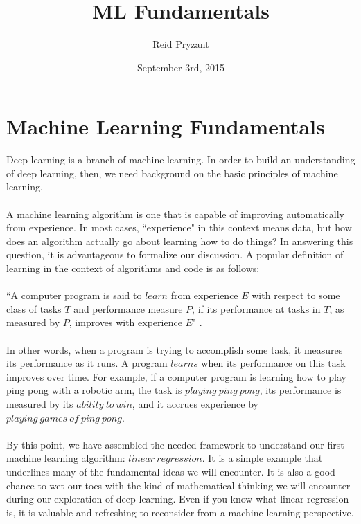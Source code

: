 \documentclass[a4paper]{article}
\title{ML Fundamentals}
\author{Reid Pryzant}
\date{September 3rd, 2015}
\begin{document}
\maketitle

\section{Machine Learning Fundamentals}
Deep learning is a branch of machine learning. In order to build an understanding of deep learning, then, we need background on the basic principles of machine learning. 
\\ \\
\noindent A machine learning algorithm is one that is capable of improving automatically from experience. In most cases, ``experience" in this context means data, but how does an algorithm actually go about learning how to do things? In answering this question, it is advantageous to formalize our discussion. A popular definition of learning in the context of algorithms and code is as follows:
\\ \\
 ``A computer program is said to $learn$ from experience $E$ with respect to some class of tasks $T$ and performance measure $P$, if its performance at tasks in $T$, as measured by $P$, improves with experience $E$" \cite{mitchell}. 
\\ \\
\noindent In other words, when a program is trying to accomplish some task, it measures its performance as it runs. A program $learns$ when its performance on this task improves over time. For example, if a computer program is learning how to play ping pong with a robotic arm, the task is $playing\ ping\ pong$, its performance is measured by its $ability\ to\ win$, and it accrues experience by $playing\ games\ of\ ping\ pong$. 
\\ \\ 
\noindent By this point, we have assembled the needed framework to understand our first machine learning algorithm: $linear\ regression$. It is a simple example that underlines many of the fundamental ideas we will encounter. It is also a good chance to wet our toes with the kind of mathematical thinking we will encounter during our exploration of deep learning. Even if you know what linear regression is, it is valuable and refreshing to reconsider from a machine learning perspective. 
\\ \\
\end{document}
